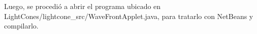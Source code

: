 \documentclass[letter]{article}
\begin{document}
Luego, se procedió a abrir el programa ubicado en LightCones/lightcone\_src/WaveFrontApplet.java, para tratarlo con NetBeans y compilarlo.


\begin{comment}
\section{\normalsize Introducción:}
La primera mitad del siglo XX se vio dominada por teorías generadoras de cambios radicales en profundidad, mientras que las teorías de la segunda mitad de ese siglo fueron teorías de ancho, de tamaño, de grosor, generadoras de conocimiento en masa pero no tan profundo.\\
Einstein pasó la última parte de su vida tratando de unificar teorías de la forma en que había entendido la gravedad, como propiedades del espacio, y trató de integrar el electromagnetismo con esta visualización.\\
¿Por qué hay partículas que vienen en tripletes, y algunas son completamente iguales excepto porque una de ellas es 35000 veces más grande que otra? ¿Cómo interrelacionar gravedad y mecánica cuántica para unificarlas? Preguntas profundas. Imaginar un acto, con una puerta que no se vuelve real a menos que un actor pase a través de ella.\\
Las palabras \textit{fuerzas} e \textit{interacciones} se pueden utilizar indistiguiblemente, a sabiendas de que las fuerzas son entendidas hoy como un intercambio de partículas.\\






\end{comment}
\end{document}

